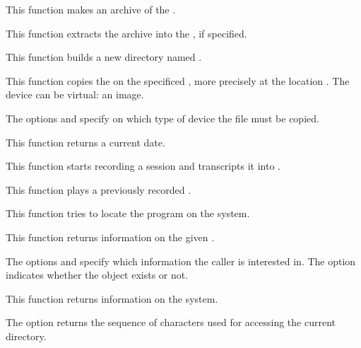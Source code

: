          {
	   This function makes an archive  of the
	   .
	 }

         {
	   This function extracts the archive  into the
	   , if specified.
	 }

         {
	   This function builds a new directory named .
	 }

         {
	   This function copies the  on the specificed
	   , more precisely at the location .
	   The device can be virtual: an image.

	   \-

	   The options  and 
	   specify on which type of device the file must be copied.
	 }

         {
	   This function returns a current date.
	 }

         {
	   This function starts recording a session and transcripts it
           into .
	 }

         {
	   This function plays a previously recorded .
	 }

         {
	   This function tries to locate the program 
	   on the system.
	 }

         {
	   This function returns information on the given .

	   \-

	   The options  and 
	   specify which information the caller is interested in. The option
            indicates whether the  object
           exists or not.
	 }

         {
	   This function returns information on the system.

	   \-

	   The option  returns the
           sequence of characters used for accessing the current directory.
	 }
